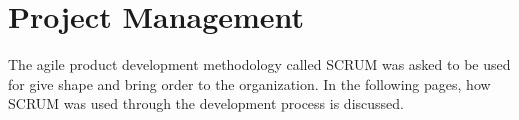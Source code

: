 \chapter{Project Management}
\label{chap:project_management_chapter}
The agile product development methodology called SCRUM was asked to be used for give shape and bring order to the organization. In the following pages, how SCRUM was used through the development process is discussed.

